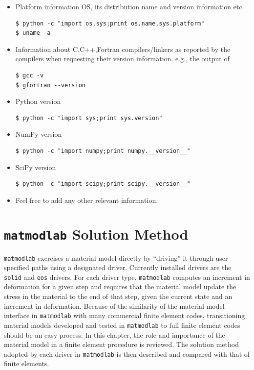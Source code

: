 \documentclass[pdf,ps2pdf,12pt,report,strict]{SANDreport/SANDreport}
\newcommand{\mml}{\texttt{matmodlab}}
\newcommand{\sol}{\texttt{solid}}
\newcommand{\eos}{\texttt{eos}}
\begin{document}
\begin{itemize}
  \item Platform information OS, its distribution name and version information
  etc.
\begin{verbatim}
$ python -c "import os,sys;print os.name,sys.platform"
$ uname -a
\end{verbatim}

  \item Information about C,C++,Fortran compilers/linkers as reported by the
  compilers when requesting their version information, e.g., the output of
\begin{verbatim}
$ gcc -v
$ gfortran --version
\end{verbatim}

  \item Python version
\begin{verbatim}
$ python -c "import sys;print sys.version"
\end{verbatim}

\item NumPy version
\begin{verbatim}
$ python -c "import numpy;print numpy.__version__"
\end{verbatim}

\item SciPy version
\begin{verbatim}
$ python -c "import scipy;print scipy.__version__"
\end{verbatim}

\item Feel free to add any other relevant information.
\end{itemize}

\chapter{\mml{} Solution Method}
\label{chap:solmeth}
\mml{} exercises a material model directly by ``driving'' it through user
specified paths using a designated driver. Currently installed drivers are the
\sol{} and \eos{} drivers. For each driver type, \mml{} computes an increment
in deformation for a given step and requires that the material model update
the stress in the material to the end of that step, given the current state
and an increment in deformation. Because of the similarity of the material
model interface in \mml{} with many commercial finite element codes,
transitioning material models developed and tested in \mml{} to full finite
element codes should be an easy process. In this chapter, the role and
importance of the material model in a finite element procedure is reviewed.
The solution method adopted by each driver in \mml{} is then described and
compared with that of finite elements.
\end{document}
